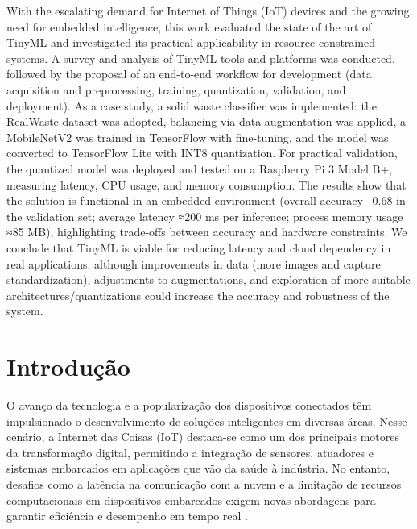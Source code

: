 \documentclass[repeatfields,xlists,xpacks,oneside]{ufrgscca}
\begin{document}
\begin{otherabstract}
With the escalating demand for Internet of Things (IoT) devices and the growing need for embedded intelligence, this work evaluated the state of the art of TinyML and investigated its practical applicability in resource-constrained systems. A survey and analysis of TinyML tools and platforms was conducted, followed by the proposal of an end-to-end workflow for development (data acquisition and preprocessing, training, quantization, validation, and deployment). As a case study, a solid waste classifier was implemented: the RealWaste dataset was adopted, balancing via data augmentation was applied, a MobileNetV2 was trained in TensorFlow with fine-tuning, and the model was converted to TensorFlow Lite with INT8 quantization. For practical validation, the quantized model was deployed and tested on a Raspberry Pi 3 Model B+, measuring latency, CPU usage, and memory consumption. The results show that the solution is functional in an embedded environment (overall accuracy ~0.68 in the validation set; average latency ≈200 ms per inference; process memory usage ≈85 MB), highlighting trade-offs between accuracy and hardware constraints. We conclude that TinyML is viable for reducing latency and cloud dependency in real applications, although improvements in data (more images and capture standardization), adjustments to augmentations, and exploration of more suitable architectures/quantizations could increase the accuracy and robustness of the system.
\end{otherabstract}

\setcounter{tocdepth}{3}

\listoffigures

\listoftables

\tableofcontents

\chapter{Introdução}
\label{cap:introducao}
O avanço da tecnologia e a popularização dos dispositivos conectados têm impulsionado o desenvolvimento de soluções inteligentes em diversas áreas. Nesse cenário, a Internet das Coisas (IoT) destaca-se como um dos principais motores da transformação digital, permitindo a integração de sensores, atuadores e sistemas embarcados em aplicações que vão da saúde à indústria. No entanto, desafios como a latência na comunicação com a nuvem e a limitação de recursos computacionais em dispositivos embarcados exigem novas abordagens para garantir eficiência e desempenho em tempo real \cite{Xavier2022}.
\end{document}
